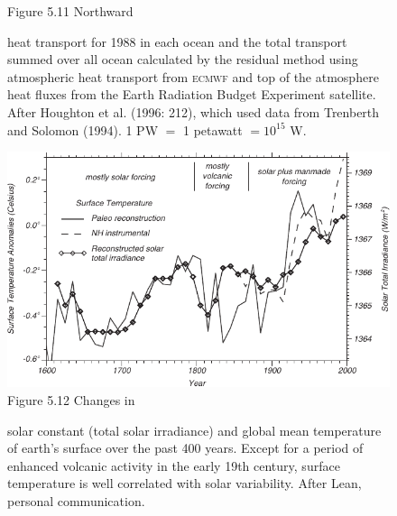 \begin{figure}[t!]
\footnotesize
Figure 5.11 Northward \rule{0mm}{3ex}heat
transport for 1988 in each ocean and the total
transport summed over all ocean calculated by the residual method
using atmospheric heat transport from \textsc{ecmwf} and top of the
atmosphere heat fluxes from the Earth Radiation Budget Experiment
satellite. After Houghton et al. (1996: 212), which used data from
Trenberth and Solomon (1994). 1 PW $=$ 1 petawatt $= 10^{15}$ W.
\label{fig:heattransport}
\vspace{-4ex}
\end{figure}
\begin{figure}[b!]
\vspace{-5ex}
\includegraphics{pics/solarinfluence}
\footnotesize
Figure 5.12 Changes in \rule{0mm}{3ex}solar constant (total solar irradiance) and global mean
temperature of earth's surface over the past 400 years. Except for a
period of enhanced volcanic activity in the early 19th century,
surface temperature is well correlated with solar variability. After
Lean, personal communication.
\label{fig:solarinfluence}
\end{figure}

